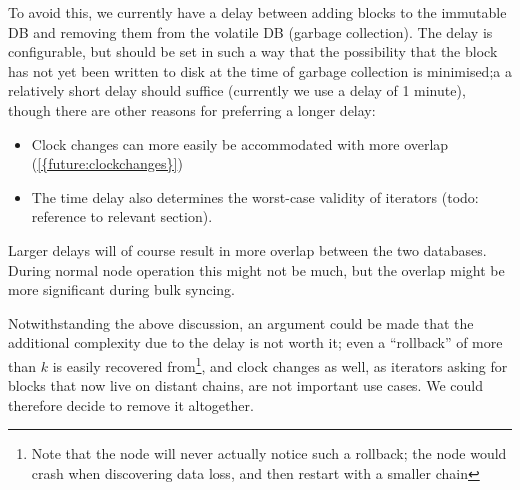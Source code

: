 To avoid this, we currently have a delay between adding blocks to the immutable
DB and removing them from the volatile DB (garbage collection). The delay is
configurable, but should be set in such a way that the possibility that the
block has not yet been written to disk at the time of garbage collection is
minimised;a a relatively short delay should suffice (currently we use a delay of
1 minute), though there are other reasons for preferring a longer delay:

\begin{itemize}
\item Clock changes can more easily be accommodated with more overlap (\cref{{future:clockchanges}})
\item The time delay also determines the worst-case validity of iterators
(todo: reference to relevant section).
\end{itemize}

Larger delays will of course result in more overlap between the two databases.
During normal node operation this might not be much, but the overlap might be
more significant during bulk syncing.

Notwithstanding the above discussion, an argument could be made that the
additional complexity due to the delay is not worth it; even a ``rollback'' of
more than $k$ is easily recovered from\footnote{Note that the node will never
actually notice such a rollback; the node would crash when discovering data
loss, and then restart with a smaller chain}, and clock changes as well, as
iterators asking for blocks that now live on distant chains, are not important
use cases. We could therefore decide to remove it altogether.
